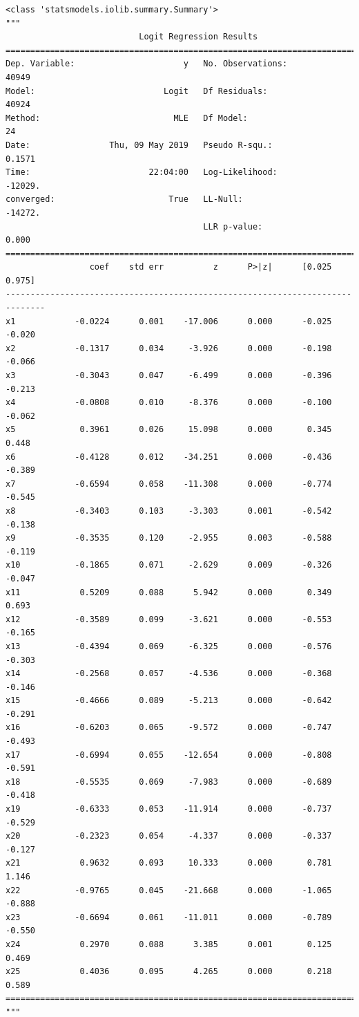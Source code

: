 \documentclass[8pt,onecolumn,aps,pra]{revtex4-1}
\begin{document}
    
    \begin{verbatim}
<class 'statsmodels.iolib.summary.Summary'>
"""
                           Logit Regression Results                           
==============================================================================
Dep. Variable:                      y   No. Observations:                40949
Model:                          Logit   Df Residuals:                    40924
Method:                           MLE   Df Model:                           24
Date:                Thu, 09 May 2019   Pseudo R-squ.:                  0.1571
Time:                        22:04:00   Log-Likelihood:                -12029.
converged:                       True   LL-Null:                       -14272.
                                        LLR p-value:                     0.000
==============================================================================
                 coef    std err          z      P>|z|      [0.025      0.975]
------------------------------------------------------------------------------
x1            -0.0224      0.001    -17.006      0.000      -0.025      -0.020
x2            -0.1317      0.034     -3.926      0.000      -0.198      -0.066
x3            -0.3043      0.047     -6.499      0.000      -0.396      -0.213
x4            -0.0808      0.010     -8.376      0.000      -0.100      -0.062
x5             0.3961      0.026     15.098      0.000       0.345       0.448
x6            -0.4128      0.012    -34.251      0.000      -0.436      -0.389
x7            -0.6594      0.058    -11.308      0.000      -0.774      -0.545
x8            -0.3403      0.103     -3.303      0.001      -0.542      -0.138
x9            -0.3535      0.120     -2.955      0.003      -0.588      -0.119
x10           -0.1865      0.071     -2.629      0.009      -0.326      -0.047
x11            0.5209      0.088      5.942      0.000       0.349       0.693
x12           -0.3589      0.099     -3.621      0.000      -0.553      -0.165
x13           -0.4394      0.069     -6.325      0.000      -0.576      -0.303
x14           -0.2568      0.057     -4.536      0.000      -0.368      -0.146
x15           -0.4666      0.089     -5.213      0.000      -0.642      -0.291
x16           -0.6203      0.065     -9.572      0.000      -0.747      -0.493
x17           -0.6994      0.055    -12.654      0.000      -0.808      -0.591
x18           -0.5535      0.069     -7.983      0.000      -0.689      -0.418
x19           -0.6333      0.053    -11.914      0.000      -0.737      -0.529
x20           -0.2323      0.054     -4.337      0.000      -0.337      -0.127
x21            0.9632      0.093     10.333      0.000       0.781       1.146
x22           -0.9765      0.045    -21.668      0.000      -1.065      -0.888
x23           -0.6694      0.061    -11.011      0.000      -0.789      -0.550
x24            0.2970      0.088      3.385      0.001       0.125       0.469
x25            0.4036      0.095      4.265      0.000       0.218       0.589
==============================================================================
"""
    \end{verbatim}
\end{document}

